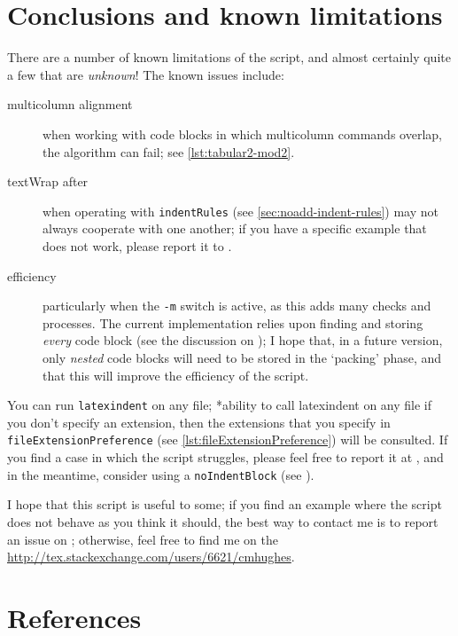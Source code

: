 \documentclass[10pt]{article}
\begin{document}
\section{Conclusions and known limitations}\label{sec:knownlimitations}
 There are a number of known limitations of the script, and almost certainly quite a few
 that are \emph{unknown}! The known issues include:
 \begin{description}
  \item[multicolumn alignment] when working with code blocks in which multicolumn
        commands overlap, the algorithm can fail; see \vref{lst:tabular2-mod2}.
  \item[textWrap after] when operating with \texttt{indentRules} (see
        \vref{sec:noadd-indent-rules}) may not always cooperate with one another; if you
        have a specific example that does not work, please report it to
        \cite{latexindent-home}.
  \item[efficiency] particularly when the \texttt{-m} switch is active, as this adds many
        checks and processes. The current implementation relies upon finding and storing
        \emph{every} code block (see the discussion on ); I hope
        that, in a future version, only \emph{nested} code blocks will need to be stored
        in the `packing' phase, and that this will improve the efficiency of the script.
 \end{description}

 You can run \texttt{latexindent} on any file; *{ability to call
 latexindent on any file} if you don't specify an extension, then the extensions that you
 specify in \lstinline[breaklines=true]!fileExtensionPreference! (see
 \vref{lst:fileExtensionPreference}) will be consulted. If you find a case in which the
 script struggles, please feel free to report it at \cite{latexindent-home}, and in the
 meantime, consider using a \texttt{noIndentBlock} (see ).%

 I hope that this script is useful to some; if you find an example where the script does
 not behave as you think it should, the best way to contact me is to report an issue on
 \cite{latexindent-home}; otherwise, feel free to find me on the
 \url{http://tex.stackexchange.com/users/6621/cmhughes}.
\nocite{*}
\section{References}
 \printbibliography[heading=subbibnumbered,title={perl-related links},keyword=perl]
\end{document}

